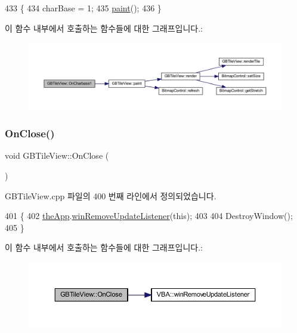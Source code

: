 \begin{DoxyCode}
433 \{
434   charBase = 1;
435   \mbox{\hyperlink{class_g_b_tile_view_aa78a471956e777509644a0a04bab2c4d}{paint}}();
436 \}
\end{DoxyCode}
이 함수 내부에서 호출하는 함수들에 대한 그래프입니다.\+:
\nopagebreak
\begin{figure}[H]
\begin{center}
\leavevmode
\includegraphics[width=350pt]{class_g_b_tile_view_a9d5c6de9e7d359cf221b164f51cb6a18_cgraph}
\end{center}
\end{figure}
\mbox{\label{class_g_b_tile_view_a59304e229d01ff07e7e232389d19017b}} 
\subsubsection{\texorpdfstring{On\+Close()}{OnClose()}}
{\footnotesize\ttfamily void G\+B\+Tile\+View\+::\+On\+Close (\begin{DoxyParamCaption}{ }\end{DoxyParamCaption})\hspace{0.3cm}{\ttfamily [protected]}}



G\+B\+Tile\+View.\+cpp 파일의 400 번째 라인에서 정의되었습니다.


\begin{DoxyCode}
401 \{
402   \mbox{\hyperlink{_v_b_a_8cpp_a8095a9d06b37a7efe3723f3218ad8fb3}{theApp}}.\mbox{\hyperlink{class_v_b_a_a2d31a0656df2230310aa8dc9e3a735d3}{winRemoveUpdateListener}}(\textcolor{keyword}{this});
403   
404   DestroyWindow();
405 \}
\end{DoxyCode}
이 함수 내부에서 호출하는 함수들에 대한 그래프입니다.\+:
\nopagebreak
\begin{figure}[H]
\begin{center}
\leavevmode
\includegraphics[width=350pt]{class_g_b_tile_view_a59304e229d01ff07e7e232389d19017b_cgraph}
\end{center}
\end{figure}
\mbox{\label{class_g_b_tile_view_a6d47aa6bfc46f3d698272efb7da79dc4}} 
